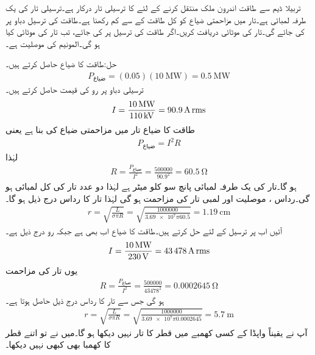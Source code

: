 تربیلا ڈیم سے  طاقت اندرون ملک منتقل کرنے کے لئے  کا ترسیلی تار درکار ہے۔ترسیلی تار کی یک طرفہ لمبائی  ہے۔تار میں مزاحمتی ضیاع کو کل طاقت کے  سے کم رکھنا ہے۔طاقت کی ترسیل  دباو پر کی جائے گی۔تار کی موٹائی دریافت کریں۔اگر طاقت کی ترسیل  پر کی جائے، تب تار کی موٹائی کیا ہو گی۔المونیم کی موصلیت  ہے۔

حل:طاقت کا ضیاع حاصل کرتے ہیں۔
\begin{align*}
P_{\text{ضیاع}}=(0.05)(\SI{10}{\mega\watt})=\SI{0.5}{\mega\watt}
\end{align*}
ترسیلی دباو پر رو کی قیمت حاصل کرتے ہیں۔
\begin{align*}
I=\frac{\SI{10}{\mega\watt}}{\SI{110}{\kilo\volt}}=\SI{90.9}{\ampere}\,{\textup{rms}}
\end{align*}
طاقت کا ضیاع تار میں مزاحمتی ضیاع کی بنا ہے یعنی
\begin{align*}
P_{\text{ضیاع}}=I^2 R
\end{align*}
لہٰذا
\begin{align*}
R=\frac{P_{\text{ضیاع}}}{I^2}=\frac{\num{500000}}{90.9^2}=\SI{60.5}{\ohm}
\end{align*}
ہو گا۔تار کی یک طرفہ لمبائی پانچ سو کلو میٹر ہے لہٰذا دو عدد تار کی کل لمبائی  ہو گی۔رداس ، موصلیت  اور  لمبی تار کی مزاحمت  ہو گی لہٰذا تار کا رداس درج ذیل ہو گا۔
\begin{align*}
r=\sqrt{\frac{L}{\sigma \pi R}}=\sqrt{\frac{\num{1000000}}{\num{3.69e7} \pi 60.5}}=\SI{1.19}{\centi\meter}
\end{align*}
آئیں اب  پر ترسیل کے لئے حل کرتے ہیں۔طاقت کا ضیاع اب بھی   ہے جبکہ رو درج ذیل ہے۔
\begin{align*}
I=\frac{\SI{10}{\mega\watt}}{\SI{230}{\volt}}=\SI{43478}{\ampere}\,{\textup{rms}}
\end{align*}
یوں تار کی مزاحمت
\begin{align*}
R=\frac{P_{\text{ضیاع}}}{I^2}=\frac{\num{500000}}{43478^2}=\SI{0.0002645}{\ohm}
\end{align*}
ہو گی جس سے تار کا رداس درج ذیل حاصل ہوتا ہے۔
\begin{align*}
r=\sqrt{\frac{L}{\sigma \pi R}}=\sqrt{\frac{\num{1000000}}{\num{3.69e7} \pi 0.0002645}}=\SI{5.7}{\meter}
\end{align*}
آپ نے یقیناً واپڈا کے کسی کھمبے میں  قطر کا تار نہیں دیکھا ہو گا۔میں نے تو اتنے قطر کا کھمبا بھی کبھی نہیں دیکھا۔

